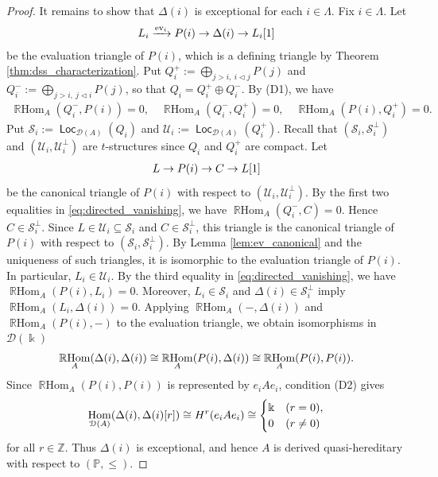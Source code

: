 \documentclass[a4paper,reqno,11pt]{amsart}
\numberwithin{equation}{section}
\theoremstyle{definition}
\newcommand{\D}{\mathcal{D}}
\renewcommand{\S}{\mathcal{S}}
\newcommand{\U}{\mathcal{U}}
\newcommand{\ZZ}{\mathbb{Z}}
\newcommand{\PP}{\mathbb{P}}
\newcommand{\bde}{\Delta}
\newcommand{\kk}{\Bbbk}
\newcommand{\ev}{\mathrm{ev}}
\DeclareMathOperator{\Loc}{\mathsf{Loc}}
\DeclareMathOperator{\Hom}{Hom}
\DeclareMathOperator{\RHom}{\mathbb{R}Hom}
\begin{document}
\begin{proof}
It remains to show that $\bde(i)$ is exceptional for each $i\in\Lambda$.
Fix $i\in\Lambda$.
Let
\begin{align}
L_{i}\xrightarrow{\ev_{i}}P(i)\to\bde(i)\to L_{i}[1]\notag
\end{align}
be the evaluation triangle of $P(i)$, which is a defining triangle by Theorem \ref{thm:dss_characterization}.
Put $Q_{i}^{+}:=\bigoplus_{j>i,\ i\triangleleft j}P(j)$ and $Q_{i}^{-}:=\bigoplus_{j>i,\ j\triangleleft i}P(j)$, so that $Q_{i}=Q_{i}^{+}\oplus Q_{i}^{-}$.
By (D1), we have
\begin{align}\label{eq:directed_vanishing}
\RHom_{A}(Q_{i}^{-},P(i))=0,\quad \RHom_{A}(Q_{i}^{-},Q_{i}^{+})=0,\quad \RHom_{A}(P(i),Q_{i}^{+})=0.
\end{align}
Put $\S_{i}:=\Loc_{\D(A)}(Q_{i})$ and $\U_{i}:=\Loc_{\D(A)}(Q_{i}^{+})$.
Recall that $(\S_{i},\S_{i}^{\perp})$ and $(\U_{i},\U_{i}^{\perp})$ are $t$-structures since $Q_{i}$ and $Q_{i}^{+}$ are compact.
Let
\begin{align}
L\to P(i)\to C\to L[1]\notag
\end{align}
be the canonical triangle of $P(i)$ with respect to $(\U_{i},\U_{i}^{\perp})$.
By the first two equalities in \eqref{eq:directed_vanishing}, we have $\RHom_{A}(Q_{i}^{-},C)=0$.
Hence $C\in\S_{i}^{\perp}$.
Since $L\in\U_{i}\subseteq\S_{i}$ and $C\in\S_{i}^{\perp}$, this triangle is the canonical triangle of $P(i)$ with respect to $(\S_{i},\S_{i}^{\perp})$.
By Lemma \ref{lem:ev_canonical} and the uniqueness of such triangles, it is isomorphic to the evaluation triangle of $P(i)$.
In particular, $L_{i}\in\U_{i}$.
By the third equality in \eqref{eq:directed_vanishing}, we have $\RHom_{A}(P(i),L_{i})=0$.
Moreover, $L_{i}\in\S_{i}$ and $\bde(i)\in\S_{i}^{\perp}$ imply $\RHom_{A}(L_{i},\bde(i))=0$.
Applying $\RHom_{A}(-,\bde(i))$ and $\RHom_{A}(P(i),-)$ to the evaluation triangle, we obtain isomorphisms in $\D(\kk)$
\begin{align}
\RHom_{A}(\bde(i),\bde(i)) \cong\RHom_{A}(P(i),\bde(i)) \cong\RHom_{A}(P(i),P(i)).\notag
\end{align}
Since $\RHom_{A}(P(i),P(i))$ is represented by $e_{i}Ae_{i}$, condition (D2) gives
\begin{align}
\Hom_{\D(A)}(\bde(i),\bde(i)[r]) \cong H^{r}(e_{i}Ae_{i}) \cong
\begin{cases}
\kk & (r=0),\\
0 & (r\neq 0)
\end{cases}\notag
\end{align}
for all $r\in\ZZ$.
Thus $\bde(i)$ is exceptional, and hence $A$ is derived quasi-hereditary with respect to $(\PP,\leq)$.
\end{proof}
\end{document}
